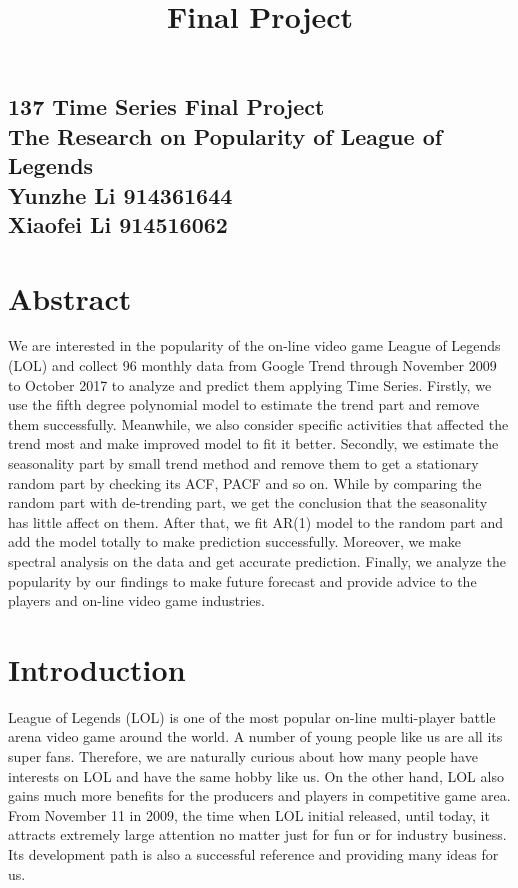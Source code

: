 \documentclass[11pt,a4paper]{article}
\begin{document}
\title{Final Project}

\pagestyle{fancy}

{
\fancyhf{}
\cfoot{\thepage}
}

\begin{center}
\subsection*{137 Time Series Final Project\\The Research on Popularity of League of Legends \\Yunzhe Li 914361644\\Xiaofei Li 914516062 }
\end{center}

\section*{Abstract}
We are interested in the popularity of the on-line video game League of Legends (LOL) and collect 96 monthly data from Google Trend through November 2009 to October 2017 to analyze and predict them applying Time Series. Firstly, we use the fifth degree polynomial model to estimate the trend part and remove them successfully. Meanwhile, we also consider specific activities that affected the trend most and make improved model to fit it better. Secondly, we estimate the seasonality part by small trend method and remove them to get a stationary random part by checking its ACF, PACF and so on. While by comparing the random part  with de-trending part, we get the conclusion that the seasonality has little affect on them. After that, we fit AR(1) model to the random part and add the model totally to make prediction successfully. Moreover, we make spectral analysis on the data and get accurate prediction. Finally, we analyze the popularity by our findings to make future forecast and provide advice to the players and on-line video game industries.


\section*{Introduction}
League of Legends (LOL) is one of the most popular on-line multi-player battle arena video game around the world. A number of young people like us are all its super fans. Therefore, we are naturally curious about how many people have interests on LOL and have the same hobby like us. On the other hand, LOL also gains much more benefits for the producers and players in competitive game area. From November 11 in 2009, the time when LOL initial released, until today, it attracts extremely large attention no matter just for fun or for industry business. Its development path is also a successful reference and providing many ideas for us. 
\end{document}
